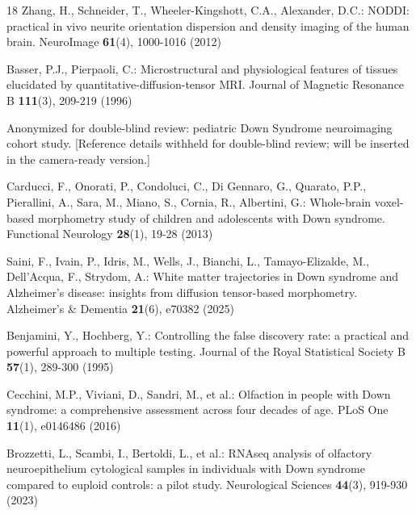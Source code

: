 \documentclass[runningheads]{llncs}
\begin{document}
\begin{thebibliography}{18}
Zhang, H., Schneider, T., Wheeler-Kingshott, C.A., Alexander, D.C.: NODDI:
practical in vivo neurite orientation dispersion and density imaging of the
human brain. NeuroImage \textbf{61}(4), 1000-1016 (2012)

Basser, P.J., Pierpaoli, C.: Microstructural and physiological features of
tissues elucidated by quantitative-diffusion-tensor MRI. Journal of Magnetic
Resonance B \textbf{111}(3), 209-219 (1996)

Anonymized for double-blind review: pediatric Down Syndrome neuroimaging
cohort study. [Reference details withheld for double-blind review; will be
inserted in the camera-ready version.]

Carducci, F., Onorati, P., Condoluci, C., Di Gennaro, G., Quarato, P.P.,
Pierallini, A., Sara, M., Miano, S., Cornia, R., Albertini, G.: Whole-brain
voxel-based morphometry study of children and adolescents with Down syndrome.
Functional Neurology \textbf{28}(1), 19-28 (2013)

Saini, F., Ivain, P., Idris, M., Wells, J., Bianchi, L., Tamayo-Elizalde, M.,
Dell'Acqua, F., Strydom, A.: White matter trajectories in Down syndrome
and Alzheimer's disease: insights from diffusion tensor-based morphometry.
Alzheimer's \& Dementia \textbf{21}(6), e70382 (2025)

Benjamini, Y., Hochberg, Y.: Controlling the false discovery rate: a practical
and powerful approach to multiple testing. Journal of the Royal Statistical
Society B \textbf{57}(1), 289-300 (1995)

Cecchini, M.P., Viviani, D., Sandri, M., et al.: Olfaction in people with
Down syndrome: a comprehensive assessment across four decades of age.
PLoS One \textbf{11}(1), e0146486 (2016)

Brozzetti, L., Scambi, I., Bertoldi, L., et al.: RNAseq analysis of
olfactory neuroepithelium cytological samples in individuals with Down
syndrome compared to euploid controls: a pilot study. Neurological
Sciences \textbf{44}(3), 919-930 (2023)

\end{thebibliography}
\end{document}
